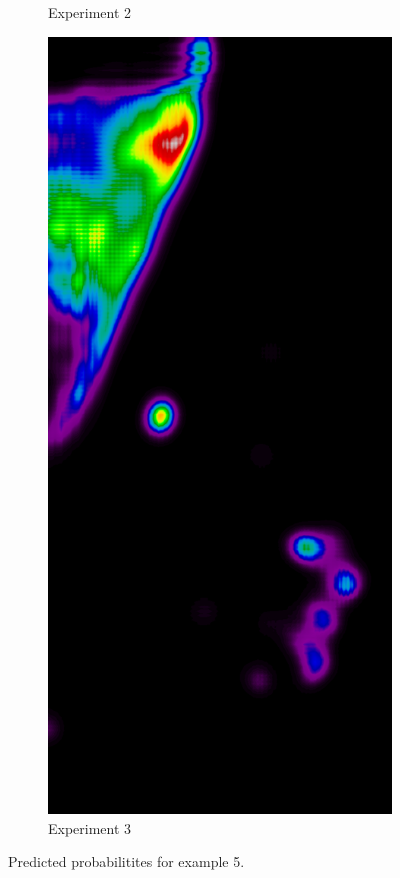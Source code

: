 \begin{figure}[h!]
\begin{subfigure}{0.195\textwidth}
		\caption{Experiment 2}
    \end{subfigure}
    \begin{subfigure}{0.195\textwidth}
		\centering
			\includegraphics[width=\textwidth]{plots/examples/example5_probs_3.png}
		\caption{Experiment 3}
    \end{subfigure}
	\caption[Predictions for example 5]{Predicted probabilitites for example 5.}
\end{figure}

